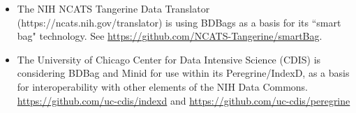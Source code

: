 \documentclass[11pt]{article}
\begin{document}
\begin{itemize}
\item
The NIH NCATS Tangerine Data Translator (https://ncats.nih.gov/translator) is using BDBags
as a basis for its ``smart bag" technology. See 
\url{https://github.com/NCATS-Tangerine/smartBag}.

\item
The University of Chicago Center for Data Intensive Science (CDIS) is considering 
BDBag and Minid for use within its Peregrine/IndexD, as a basis for interoperability with other elements
of the NIH Data Commons. \url{https://github.com/uc-cdis/indexd} and \url{https://github.com/uc-cdis/peregrine}
\end{itemize}




\end{document}
